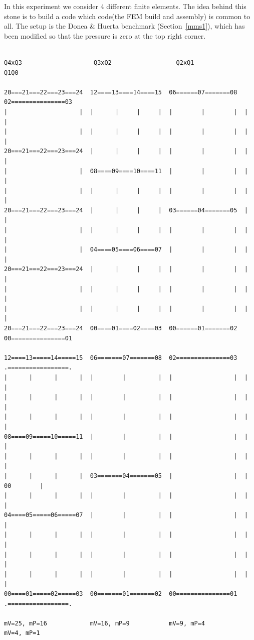 

In this experiment we consider 4 different finite elements. The idea behind this stone 
is to build a code which code(the FEM build and assembly) is common to all. 
The setup is the Donea \& Huerta benchmark (Section~\ref{mms1}), which has been modified so that 
the pressure is zero at the top right corner.

\begin{verbatim}

Q4xQ3                    Q3xQ2                  Q2xQ1                 Q1Q0

20===21===22===23===24  12====13====14====15  06======07=======08  02===============03
|                    |  |      |     |     |  |        |        |  |                 |
|                    |  |      |     |     |  |        |        |  |                 |
20===21===22===23===24  |      |     |     |  |        |        |  |                 |
|                    |  08====09====10====11  |        |        |  |                 |
|                    |  |      |     |     |  |        |        |  |                 |
20===21===22===23===24  |      |     |     |  03======04=======05  |                 |
|                    |  |      |     |     |  |        |        |  |                 |
|                    |  04====05====06====07  |        |        |  |                 |
20===21===22===23===24  |      |     |     |  |        |        |  |                 |
|                    |  |      |     |     |  |        |        |  |                 |
|                    |  |      |     |     |  |        |        |  |                 |
20===21===22===23===24  00====01====02====03  00======01=======02  00===============01 

12====13=====14=====15  06=======07=======08  02===============03  .=================.
|      |      |      |  |        |         |  |                 |  |                 |
|      |      |      |  |        |         |  |                 |  |                 |
|      |      |      |  |        |         |  |                 |  |                 |
08====09=====10=====11  |        |         |  |                 |  |                 |
|      |      |      |  |        |         |  |                 |  |                 |
|      |      |      |  03=======04=======05  |                 |  |       00        |
|      |      |      |  |        |         |  |                 |  |                 |
04====05=====06=====07  |        |         |  |                 |  |                 |
|      |      |      |  |        |         |  |                 |  |                 |
|      |      |      |  |        |         |  |                 |  |                 |
|      |      |      |  |        |         |  |                 |  |                 |
00====01=====02=====03  00=======01=======02  00===============01  .=================.

mV=25, mP=16            mV=16, mP=9           mV=9, mP=4           mV=4, mP=1      

\end{verbatim}

